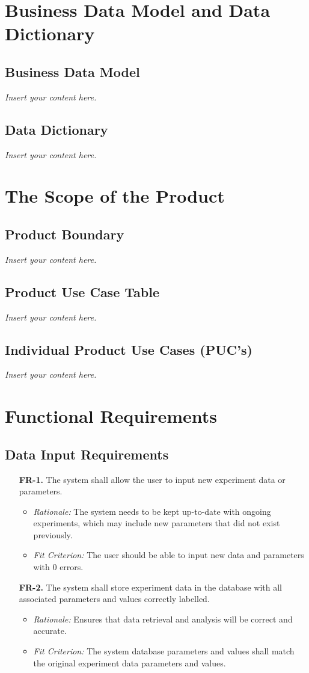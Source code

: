 \documentclass[12pt]{article}
\newcommand{\lips}{\textit{Insert your content here.}}
\begin{document}
\section{Business Data Model and Data Dictionary}
\subsection{Business Data Model}
\lips
\subsection{Data Dictionary}
\lips

\section{The Scope of the Product}
\subsection{Product Boundary}
\lips
\subsection{Product Use Case Table}
\lips
\subsection{Individual Product Use Cases (PUC's)}
\lips

\section{Functional Requirements}
\subsection{Data Input Requirements}
  \begin{enumerate}
    \item[\textbf{FR-1.}] The system shall allow the user to input new experiment data or parameters.
    \begin{itemize}
    \item \textit{Rationale:} The system needs to be kept up-to-date with ongoing experiments, which may include new parameters that did not exist previously.
    \item \textit{Fit Criterion:} The user should be able to input new data and parameters with 0 errors.
    \end{itemize}
    \item[\textbf{FR-2.}] The system shall store experiment data in the database with all associated parameters and values correctly labelled.
    \begin{itemize}
      \item \textit{Rationale:} Ensures that data retrieval and analysis will be correct and accurate.
      \item \textit{Fit Criterion:} The system database parameters and values shall match the original experiment data parameters and values.
    \end{itemize}
  \end{enumerate}
\end{document}
